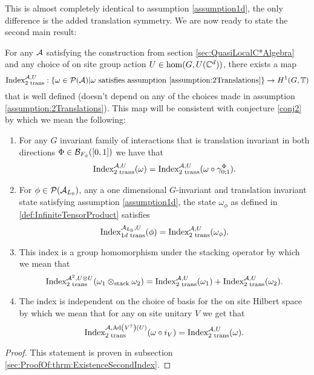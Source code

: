 \documentclass[11pt,a4paper,twoside]{article}
\numberwithin{equation}{section}
\begin{document}
This is almost completely identical to assumption \ref{assumption1d}, the only difference is the added translation symmetry. We are now ready to state the second main result:
\begin{theorem}\label{thrm:ExistenceSecondIndex}
	For any $\AA$ satisfying the construction from section \ref{sec:QuasiLocalC*Algebra} and any choice of on site group action $U\in\hom(G,U(\CC^d))$, there exists a map
	\begin{equation}
		\textrm{Index}^{\AA,U}_{2\text{ trans}}:\{\omega\in\PP(\AA)| \omega\text{ satisfies assumption \ref{assumption:2Translations}}\}\rightarrow H^1(G,\TT)
	\end{equation}
	that is well defined (doesn't depend on any of the choices made in assumption \ref{assumption:2Translations}). This map will be consistent with conjecture \ref{conj2} by which we mean the following:
	\begin{enumerate}
		\item For any $G$ invariant family of interactions that is translation invariant in both directions $\Phi\in\BB_{F_\phi}([0,1])$ we have that
		\begin{equation}
			\textrm{Index}^{\AA,U}_{2\text{ trans}}(\omega)=\textrm{Index}^{\AA,U}_{2\text{ trans}}(\omega\circ\gamma^\Phi_{0;1}).
		\end{equation}
		\item For $\phi\in\PP(\AA_{L_0})$, any a one dimensional $G$-invariant and translation invariant state satisfying assumption \ref{assumption1d}, the state $\omega_\phi$ as defined in \ref{def:InfiniteTensorProduct} satisfies
		\begin{equation}
			\textrm{Index}^{\AA_{L_0},U}_{1d\text{ trans}}(\phi)=\text{Index}^{\AA,U}_{2\text{ trans}}(\omega_\phi).
		\end{equation}
		\item This index is a group homomorphism under the stacking operator by which we mean that
		\begin{equation}
			\textrm{Index}_{\text{2 trans}}^{\AA^2,U\otimes U}(\omega_1\otimes_{\text{stack}}\omega_2)=\textrm{Index}_{\text{2 trans}}^{\AA,U}(\omega_1)+\textrm{Index}_{\text{2 trans}}^{\AA,U}(\omega_2).
		\end{equation}
		\item The index is independent on the choice of basis for the on site Hilbert space by which we mean that for any on site unitary $V$ we get that
		\begin{equation}
			\textrm{Index}^{\AA,\Ad{V^\dagger}(U)}_{\text{2 trans}}(\omega\circ i_V) =\textrm{Index}^{\AA,U}_{\text{2 trans}}(\omega).
		\end{equation}
	\end{enumerate}
\end{theorem}
\begin{proof}
	This statement is proven in subsection \ref{sec:ProofOf:thrm:ExistenceSecondIndex}.
\end{proof}
\end{document}
